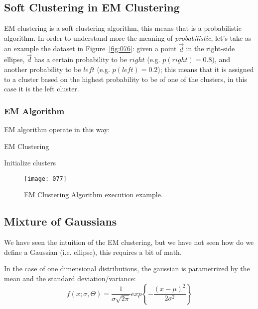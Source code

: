 \subsection{Soft Clustering in EM Clustering}
EM clustering is a soft clustering algorithm, this means that is a probabilistic algorithm. In order to understand more the meaning of \emph{probabilistic}, let's take as an example the dataset in Figure~\ref{fig:076}: given a point \(\vec{d}\) in the right-side ellipse, \(\vec{d}\) has a certain probability to be \(right\) (e.g. \(p(right) = 0.8\)), and another probability to be \(left\) (e.g. \(p(left) = 0.2\)); this means that it is assigned to a cluster based on the highest probability to be of one of the clusters, in this case it is the left cluster.

\subsubsection{EM Algorithm}
EM algorithm operate in this way:
\begin{algorithm}
    \caption{EM Clustering}
    \label{alg:em_clustering}
Initialize clusters\;
\end{algorithm}

\begin{figure}[t!]
    \centering
    \texttt{[image: 077]}
    \caption{EM Clustering Algorithm execution example.}
    \label{fig:077}
\end{figure}

\subsection{Mixture of Gaussians}
We have seen the intuition of the EM clustering, but we have not seen how do we define a Gaussian (i.e. ellipse), this requires a bit of math.

In the case of one dimensional distributions, the gaussian is parametrized by the mean and the standard deviation/variance:
\begin{equation}
    \label{eq:001}
    f(x; \sigma, \Theta) = \frac 1 {\sigma \sqrt{2\pi}} exp\left\{ - \frac {(x-\mu)^2} {2\sigma^2} \right\}
\end{equation}

